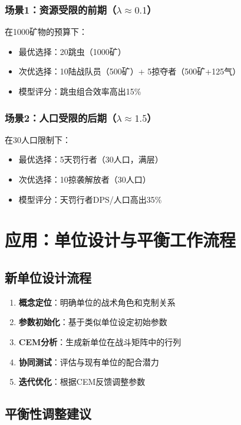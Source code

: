 \documentclass[a4paper,12pt]{article}
\begin{document}
\subsubsection{场景1：资源受限的前期（$\lambda \approx 0.1$）}
在1000矿物的预算下：
\begin{itemize}
\item 最优选择：20跳虫（1000矿）
\item 次优选择：10陆战队员（500矿）+ 5掠夺者（500矿+125气）
\item 模型评分：跳虫组合效率高出15\%
\end{itemize}

\subsubsection{场景2：人口受限的后期（$\lambda \approx 1.5$）}
在30人口限制下：
\begin{itemize}
\item 最优选择：5天罚行者（30人口，满层）
\item 次优选择：10掠袭解放者（30人口）
\item 模型评分：天罚行者DPS/人口高出35\%
\end{itemize}

\section{应用：单位设计与平衡工作流程}

\subsection{新单位设计流程}

\begin{enumerate}
\item \textbf{概念定位}：明确单位的战术角色和克制关系
\item \textbf{参数初始化}：基于类似单位设定初始参数
\item \textbf{CEM分析}：生成新单位在战斗矩阵中的行列
\item \textbf{协同测试}：评估与现有单位的配合潜力
\item \textbf{迭代优化}：根据CEM反馈调整参数
\end{enumerate}

\subsection{平衡性调整建议}
\end{document}
